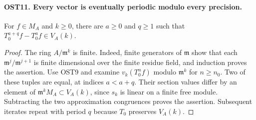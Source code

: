 \documentclass[11pt,a4paper]{article}
\numberwithin{equation}{section}
\theoremstyle{remark}\newtheorem{remark}[theorem]{Remark}
\begin{document}
\paragraph{OST11. Every vector is eventually periodic modulo every precision.}
\label{claim:OST11}
For $f\in M_A$ and $k\geq0$, there are $a\geq0$ and $q\geq1$
such that $T_0^{a+q}f-T_0^af\in V_A(k)$.
\begin{proof}
The ring $A/\mathfrak m^k$ is finite.  Indeed, finite generators
of $\mathfrak m$ show that each
$\mathfrak m^j/\mathfrak m^{j+1}$ is finite dimensional over
the finite residue field, and induction proves the assertion.
Use OST9 and examine $v_k(T_0^nf)$ modulo $\mathfrak m^k$
for $n\geq n_0$.  Two of these tuples are equal, at indices
$a<a+q$.  Their section values differ by an element of
$\mathfrak m^kM_A\subset V_A(k)$, since $s_k$ is linear
on a finite free module.  Subtracting the two approximation
congruences proves the assertion.  Subsequent iterates repeat
with period $q$ because $T_0$ preserves $V_A(k)$.
\end{proof}

\end{document}
